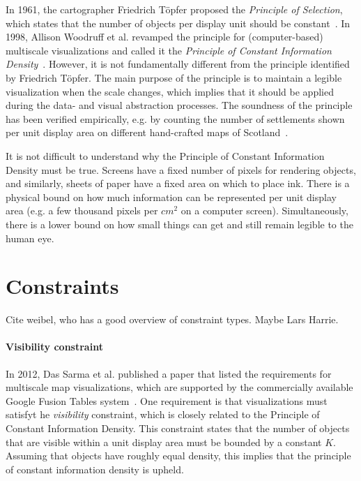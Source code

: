 \documentclass[11pt, oneside]{report}   	%
\begin{document}
In 1961, the cartographer Friedrich T\"{o}pfer proposed the \emph{Principle of Selection}, which states that the number of objects per display unit should be constant~\cite{topfer1966principles}. In 1998, Allison Woodruff et al. revamped the principle for (computer-based) multiscale visualizations and called it the \emph{Principle of Constant Information Density}~\cite{woodruff1998constant}. However, it is not fundamentally different from the principle identified by Friedrich T\"{o}pfer. The main purpose of the principle is to maintain a legible visualization when the scale changes, which implies that it should be applied during the data- and visual abstraction processes. The soundness of the principle has been verified empirically, e.g. by counting the number of settlements shown per unit display area on different hand-crafted maps of Scotland~\cite{topfer1966principles}. 

It is not difficult to understand why the Principle of Constant Information Density must be true. Screens have a fixed number of pixels for rendering objects, and similarly, sheets of paper have a fixed area on which to place ink. There is a physical bound on how much information can be represented per unit display area (e.g. a few thousand pixels per $cm^2$ on a computer screen). Simultaneously, there is a lower bound on how small things can get and still remain legible to the human eye.

\section{Constraints}

Cite weibel, who has a good overview of constraint types. Maybe Lars Harrie.

\paragraph{Visibility constraint}
In 2012, Das Sarma et al. published a paper that listed the requirements for multiscale map visualizations, which are supported by the commercially available Google Fusion Tables system~\cite{sarma2012fusiontables}. One requirement is that visualizations must satisfyt he \emph{visibility} constraint, which is closely related to the Principle of Constant Information Density. This constraint states that the number of objects that are visible within a unit display area must be bounded by a constant $K$. Assuming that objects have roughly equal density, this implies that the principle of constant information density is upheld.
\end{document}
